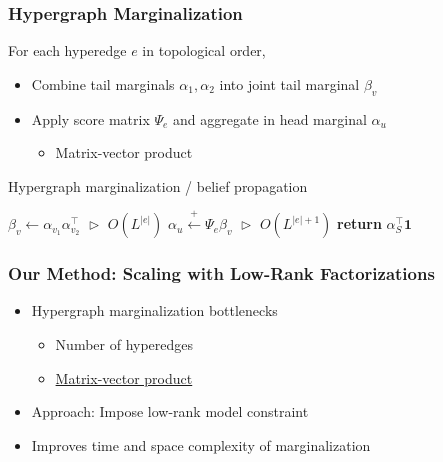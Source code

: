 \documentclass{beamer}
\begin{document}
\begin{frame}
\frametitle{Hypergraph Marginalization}
For each hyperedge $e$ in topological order,
\vspace{1em}
\begin{itemize}
\item Combine tail marginals $\alpha_1,\alpha_2$ into joint tail marginal $\beta_v$
\vspace{1em}
\item Apply score matrix $\Psi_e$ and aggregate in head marginal $\alpha_u$
    \begin{itemize}
    \item Matrix-vector product
    \end{itemize}
\end{itemize}
\vspace{1em}
\centering
\begin{algorithm}[H]
\caption{\label{alg:hypergraph-marg} Hypergraph marginalization / belief propagation}
\begin{algorithmic} 
\STATE $\beta_v \gets \alpha_{v_1}\alpha_{v_2}^\top$
    \hfill $\vartriangleright$ $O(L^{|e|})$
\STATE $\alpha_u \stackrel{+}{\gets} \Psi_e\beta_v$
    \hfill $\vartriangleright$ $O(L^{|e|+1})$
\ENDFOR
\STATE \textbf{return} $\alpha_S^\top \mathbf{1}$
\end{algorithmic}

\end{algorithm}
\end{frame}

\begin{frame}
\frametitle{Our Method: Scaling with Low-Rank Factorizations}
\begin{itemize}
\item Hypergraph marginalization bottlenecks
    \begin{itemize}
    \item Number of hyperedges
    \item \underline{Matrix-vector product}
    \end{itemize}
\vspace{1em}
\item Approach: Impose low-rank model constraint
\vspace{1em}
\item Improves time and space complexity of marginalization
\end{itemize}
\end{frame}
\end{document}
